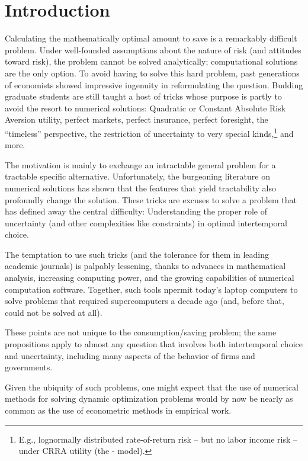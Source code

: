 \documentclass[titlepage]{\econtex}
\begin{document}
   
\hypertarget{Introduction}{}
\section{Introduction}

Calculating the mathematically optimal amount to save is a remarkably difficult
problem.  Under well-founded assumptions about the nature of
risk (and attitudes toward risk), the problem cannot be solved analytically; computational solutions are the only option. 
  To avoid having to solve
this hard problem, past generations of economists showed impressive ingenuity in
reformulating the question.  Budding graduate students are still
taught a host of tricks whose purpose is partly to avoid the resort to
numerical solutions: Quadratic or
Constant Absolute Risk Aversion utility, perfect markets, perfect
insurance, perfect foresight, the ``timeless'' perspective, the
restriction of uncertainty to very special kinds,\footnote{E.g.,
  lognormally distributed rate-of-return risk -- but no labor income
  risk -- under CRRA utility (the
  \cite{merton:restat}-\cite{samuelson:portfolio} model).} and more.

The motivation is mainly to exchange an intractable general problem
for a tractable specific alternative.  Unfortunately, the burgeoning
literature on numerical solutions has shown that the features that
yield tractability also profoundly change the solution.  These tricks
are excuses to solve a problem that has defined away the central
difficulty: Understanding the proper role of uncertainty (and other
complexities like constraints) in optimal intertemporal choice.

The temptation to use such tricks (and the tolerance for them in
leading academic journals) is palpably lessening, thanks to advances in
mathematical analysis, increasing computing power, and the growing
capabilities of numerical computation software.  Together, such tools
npermit today's laptop computers to solve problems that required
supercomputers a decade ago (and, before that, could not be solved at
all).

These points are not unique to the consumption/saving problem; the
same propositions apply to almost any question that involves both
intertemporal choice and uncertainty, including many aspects of the
behavior of firms and governments.  

Given the ubiquity of such problems, one might expect that the use of
numerical methods for solving dynamic optimization problems would by
now be nearly as common as the use of econometric methods in empirical
work.  
\end{document}
